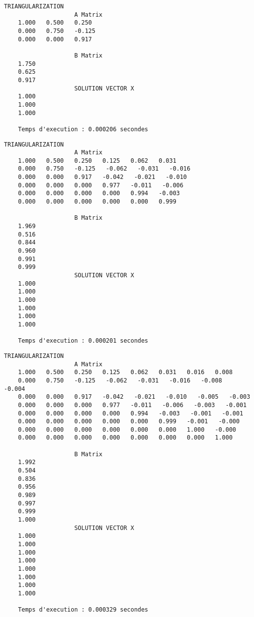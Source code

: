 \begin{lstlisting}[caption={$A_5X=B$} results, basicstyle=\fontsize{8}{10}\selectfont]
					TRIANGULARIZATION 
					A Matrix 
	1.000   0.500   0.250   
	0.000   0.750   -0.125   
	0.000   0.000   0.917   
	
					B Matrix 
	1.750   
	0.625   
	0.917   
					SOLUTION VECTOR X 
	1.000   
	1.000   
	1.000   
	
	Temps d'execution : 0.000206 secondes
\end{lstlisting}
\begin{lstlisting}[caption={$A_6X=B$} results, basicstyle=\fontsize{8}{10}\selectfont]
					TRIANGULARIZATION 
					A Matrix 
	1.000   0.500   0.250   0.125   0.062   0.031   
	0.000   0.750   -0.125   -0.062   -0.031   -0.016   
	0.000   0.000   0.917   -0.042   -0.021   -0.010   
	0.000   0.000   0.000   0.977   -0.011   -0.006   
	0.000   0.000   0.000   0.000   0.994   -0.003   
	0.000   0.000   0.000   0.000   0.000   0.999   
	
					B Matrix 
	1.969   
	0.516   
	0.844   
	0.960   
	0.991   
	0.999   
					SOLUTION VECTOR X 
	1.000   
	1.000   
	1.000   
	1.000   
	1.000   
	1.000   
	
	Temps d'execution : 0.000201 secondes
\end{lstlisting}
\begin{lstlisting}[caption={$A_7X=B$} results, basicstyle=\fontsize{5}{8}\selectfont]
					TRIANGULARIZATION 
					A Matrix 
	1.000   0.500   0.250   0.125   0.062   0.031   0.016   0.008   
	0.000   0.750   -0.125   -0.062   -0.031   -0.016   -0.008   -0.004   
	0.000   0.000   0.917   -0.042   -0.021   -0.010   -0.005   -0.003   
	0.000   0.000   0.000   0.977   -0.011   -0.006   -0.003   -0.001   
	0.000   0.000   0.000   0.000   0.994   -0.003   -0.001   -0.001   
	0.000   0.000   0.000   0.000   0.000   0.999   -0.001   -0.000   
	0.000   0.000   0.000   0.000   0.000   0.000   1.000   -0.000   
	0.000   0.000   0.000   0.000   0.000   0.000   0.000   1.000   
	
					B Matrix 
	1.992   
	0.504   
	0.836   
	0.956   
	0.989   
	0.997   
	0.999   
	1.000   
					SOLUTION VECTOR X 
	1.000   
	1.000   
	1.000   
	1.000   
	1.000   
	1.000   
	1.000   
	1.000   
	
	Temps d'execution : 0.000329 secondes
\end{lstlisting}
